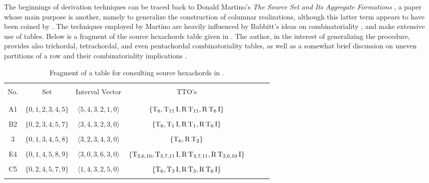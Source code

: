 The beginnings of derivation techniques can be traced back to Donald Martino's \emph{The Source Set and Its Aggregate Formations} \cite{Martino1961}, a paper whose main purpose is another, namely to generalize the construction of columnar realizations, although this latter term appears to have been coined by \cite{Starr1984}. The techniques employed by Martino are heavily influenced by Babbitt's ideas on combinatoriality \cite[224]{Martino1961}, and make extensive use of tables. Below is a fragment of the source hexachords table given in \cite[229]{Martino1961}. The author, in the interest of generalizing the procedure, provides also trichordal, tetrachordal, and even pentachordal combinatoriality tables, as well as a somewhat brief discussion on uneven partitions of a row and their combinatoriality implications \cite[267]{Martino1961}.

\begin{table}[htbp]
    \caption[Martino's Source Hexachords]{Fragment of a table for consulting source hexachords in \cite[229]{Martino1961}.}
    \centering
    \vspace{12pt}
    \begin{tabular}{c|cccccc}
        \hline\\
        No. & Set & Interval Vector & TTO's \\\\
        \hline\\
        A1 & $\{0,1,2,3,4,5\}$ & $\langle 5,4,3,2,1,0 \rangle$ & $\{\operatorname{T}_6,\operatorname{T}_{11}\operatorname{I},\operatorname{R}\operatorname{T}_{11},\operatorname{R}\operatorname{T}_6\operatorname{I}\}$ \\\\
        B2 & $\{0,2,3,4,5,7\}$ & $\langle 3,4,3,2,3,0 \rangle$ & $\{\operatorname{T}_6,\operatorname{T}_{1}\operatorname{I},\operatorname{R}\operatorname{T}_{1},\operatorname{R}\operatorname{T}_6\operatorname{I}\}$ \\\\
        3 & $\{0,1,3,4,5,8\}$ & $\langle 3,2,3,4,3,0 \rangle$ & $\{\operatorname{T}_6,\operatorname{R}\operatorname{T}_2\}$ \\\\
        E4 & $\{0,1,4,5,8,9\}$ & $\langle 3,0,3,6,3,0 \rangle$ & $\{\operatorname{T}_{2,6,10},\operatorname{T}_{3,7,11}\operatorname{I},\operatorname{R}\operatorname{T}_{3,7,11},\operatorname{R}\operatorname{T}_{2,6,10}\operatorname{I}\}$ \\\\
        C5 & $\{0,2,4,5,7,9\}$ & $\langle 1,4,3,2,5,0 \rangle$ & $\{\operatorname{T}_6,\operatorname{T}_{3}\operatorname{I},\operatorname{R}\operatorname{T}_{3},\operatorname{R}\operatorname{T}_6\operatorname{I}\}$ \\\\
        \hline
    \end{tabular}
\end{table}

